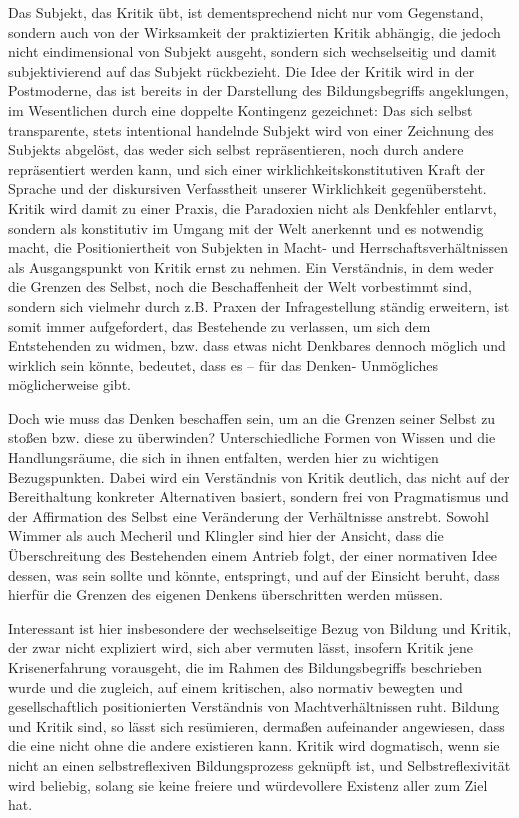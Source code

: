 Das Subjekt, das Kritik übt, ist dementsprechend nicht nur vom Gegenstand,
sondern auch von der Wirksamkeit der praktizierten Kritik abhängig, die jedoch
nicht eindimensional von Subjekt ausgeht, sondern sich wechselseitig und damit
subjektivierend auf das Subjekt rückbezieht. Die Idee der Kritik wird in der
Postmoderne, das ist bereits in der Darstellung des Bildungsbegriffs
angeklungen, im Wesentlichen durch eine doppelte Kontingenz gezeichnet: Das
sich selbst transparente, stets intentional handelnde Subjekt wird von einer
Zeichnung des Subjekts abgelöst, das weder sich selbst repräsentieren, noch
durch andere repräsentiert werden kann, und sich einer
\glqq wirklichkeitskonstitutiven Kraft der Sprache und der diskursiven Verfasstheit
unserer Wirklichkeit \grqq \footnotemark {} gegenübersteht. Kritik wird damit zu einer Praxis, die
Paradoxien nicht als Denkfehler entlarvt, sondern als konstitutiv im Umgang mit
der Welt  anerkennt und es notwendig macht, die Positioniertheit von Subjekten
in Macht- und Herrschaftsverhältnissen als Ausgangspunkt von Kritik ernst zu
nehmen.  Ein Verständnis, in dem weder die Grenzen des Selbst, noch die
Beschaffenheit der Welt vorbestimmt sind, sondern sich vielmehr durch z.B.
Praxen der Infragestellung ständig erweitern, ist somit immer aufgefordert, das
Bestehende zu verlassen, um sich dem Entstehenden zu widmen, bzw. \glqq dass etwas
nicht Denkbares dennoch möglich und wirklich sein könnte, bedeutet, dass es –
für das Denken- Unmögliches möglicherweise gibt.\grqq  \footnotemark
{}

Doch wie muss das Denken beschaffen sein, um an die Grenzen seiner Selbst zu
stoßen bzw. diese zu überwinden? Unterschiedliche Formen von Wissen und die
Handlungsräume, die sich in ihnen entfalten, werden hier zu wichtigen
Bezugspunkten.  Dabei wird ein Verständnis von Kritik deutlich, das nicht auf
der Bereithaltung konkreter Alternativen basiert, sondern frei von Pragmatismus
und der Affirmation des Selbst eine Veränderung der Verhältnisse anstrebt.
Sowohl Wimmer als auch Mecheril und Klingler sind hier der Ansicht, dass die
Überschreitung des Bestehenden einem Antrieb folgt, der einer normativen Idee
dessen, was sein sollte und könnte, entspringt, und auf der Einsicht beruht,
dass hierfür die Grenzen des eigenen Denkens überschritten werden müssen.

Interessant ist hier insbesondere der wechselseitige Bezug von Bildung und
Kritik, der zwar nicht expliziert wird, sich aber vermuten lässt, insofern
Kritik jene Krisenerfahrung vorausgeht, die im Rahmen des Bildungsbegriffs
beschrieben wurde und die zugleich, auf einem kritischen, also normativ
bewegten und gesellschaftlich positionierten Verständnis von Machtverhältnissen
ruht. Bildung und Kritik sind, so lässt sich resümieren, dermaßen aufeinander
angewiesen, dass die  eine nicht ohne die andere existieren kann. Kritik wird
dogmatisch, wenn sie nicht an einen selbstreflexiven Bildungsprozess geknüpft
ist, und Selbstreflexivität wird beliebig, solang sie keine freiere und
würdevollere Existenz aller zum Ziel hat. 


